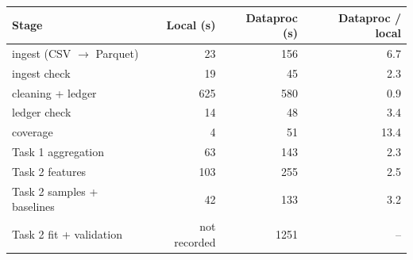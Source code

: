 \begin{tabular}{lrrr}
\toprule
Stage & Local (s) & Dataproc (s) & Dataproc / local \\
\midrule
ingest (CSV $\to$ Parquet) & 23 & 156 & 6.7 \\
ingest check & 19 & 45 & 2.3 \\
cleaning + ledger & 625 & 580 & 0.9 \\
ledger check & 14 & 48 & 3.4 \\
coverage & 4 & 51 & 13.4 \\
Task 1 aggregation & 63 & 143 & 2.3 \\
Task 2 features & 103 & 255 & 2.5 \\
Task 2 samples + baselines & 42 & 133 & 3.2 \\
Task 2 fit + validation & not recorded & 1251 & -- \\
\bottomrule
\end{tabular}
